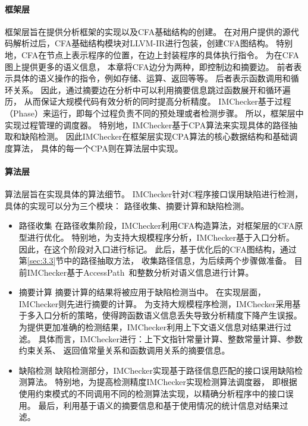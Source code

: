 \paragraph{框架层}
框架层旨在提供分析框架的实现以及CFA基础结构的创建。
在对用户提供的源代码解析过后，CFA基础结构模块对LLVM-IR进行包装，创建CFA图结构。
特别地，CFA在节点上表示程序的位置，在边上封装程序的具体执行指令。
为在CFA图上提供更多的语义信息，
本章将CFA边分为两种，即控制边和摘要边。
前者表示具体的语义操作的指令，例如存储、运算、返回等等。
后者表示函数调用和循环关系。
因此，通过摘要边在分析中可以利用摘要信息跳过函数展开和循环遍历，
从而保证大规模代码有效分析的同时提高分析精度。
IMChecker基于过程（Phase）来运行，即每个过程负责不同的预处理或者检测步骤。
所以，框架层中实现过程管理的调度器。
特别地，IMChecker基于CPA算法来实现具体的路径抽取和缺陷检测。
因此IMChecker在框架层实现CPA算法的核心数据结构和基础调度算法，
具体的每一个CPA则在算法层中实现。

\paragraph{算法层}
算法层旨在实现具体的算法细节。
IMChecker针对C程序接口误用缺陷进行检测，具体的实现可以分为三个模块：
路径收集、摘要计算和缺陷检测。
\begin{itemize}
	\item {\kaishu 路径收集} 
	在路径收集阶段，IMChecker利用CFA构造算法，对框架层的CFA原型进行优化。
	特别地，为支持大规模程序分析，IMChecker基于入口分析。
	因此，在这个阶段对入口进行标记。
	此后，基于优化后的CFA图结构，通过第\ref{sec:3.3}节中的路径抽取方法，
	收集路径信息，为后续两个步骤做准备。
	目前IMChecker基于AccessPath~\cite{15-ase-accesspath}和整数分析对语义信息进行计算。
	\item {\kaishu 摘要计算} 
	摘要计算的结果将被应用于缺陷检测当中。
	在实现层面，IMChecker则先进行摘要的计算。
	为支持大规模程序检测，IMChecker采用基于多入口分析的策略，使得跨函数语义信息丢失导致分析精度下降产生误报。
	为提供更加准确的检测结果，IMChecker利用上下文语义信息对结果进行过滤。
	具体而言，IMChecker进行：上下文指针常量计算、整数常量计算、参数约束关系、
	返回值常量关系和函数调用关系的摘要信息。
	\item {\kaishu 缺陷检测} 
	缺陷检测部分，IMChecker实现基于路径信息匹配的接口误用缺陷检测算法。
	特别地，为提高检测精度IMChecker实现检测算法调度器，
	即根据使用约束模式的不同调用不同的检测算法实现，以精确分析程序中的接口误用。
	最后，利用基于语义的摘要信息和基于使用情况的统计信息对结果过滤。
\end{itemize}


